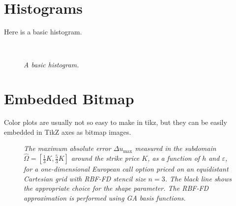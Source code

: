 \documentclass[11pt, oneside]{article}   	%
\begin{document}
\newpage
\section{Histograms}
Here is a basic histogram.
\begin{figure}[H]
\centering
\\
\caption{\emph{A basic histogram.}}
\label{fig:hist}
\end{figure}

\newpage
\section{Embedded Bitmap}
Color plots are usually not so easy to make in tikz, but they can be easily embedded in TikZ axes as bitmap images. 
\begin{figure}[H]
\centering


\caption{\emph{The maximum absolute error $\Delta u_{\max}$ measured in the subdomain $\hat\Omega=[\frac{1}{3}K,\frac{5}{3}K]$ around the strike price $K$, as a function of $h$ and $\varepsilon$, for a one-dimensional European call option priced on an equidistant Cartesian grid with RBF-FD stencil size $n=3$. The black line shows the appropriate choice for the shape parameter. The RBF-FD approximation is performed using GA basis functions.}}
\label{fig:contour1}
\end{figure}
\end{document}
